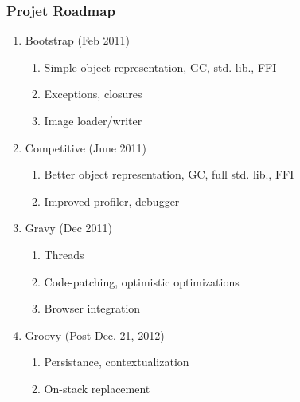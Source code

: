 \begin{frame}
\frametitle{\bf Projet Roadmap}
    \begin{enumerate}[1.]
        \item Bootstrap (Feb 2011)
        \begin{enumerate}[1.]
            \item Simple object representation, GC, std. lib., FFI
            \item Exceptions, closures
            \item Image loader/writer
        \end{enumerate}

        \item Competitive (June 2011)
        \begin{enumerate}[1.]
            \item Better object representation, GC, full std. lib., FFI
            \item Improved profiler, debugger
        \end{enumerate}

        \item Gravy (Dec 2011)
        \begin{enumerate}[1.]
            \item Threads 
            \item Code-patching, optimistic optimizations
            \item Browser integration
        \end{enumerate}

        \item Groovy (Post Dec. 21, 2012)
        \begin{enumerate}[1.]
            \item Persistance, contextualization
            \item On-stack replacement
        \end{enumerate}
    \end{enumerate}
\end{frame}
